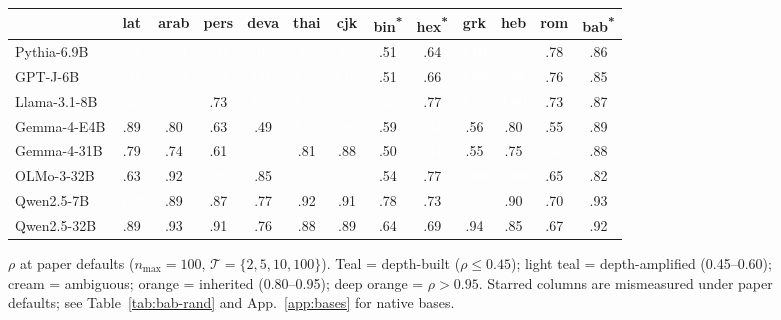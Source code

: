 \documentclass[10pt,letterpaper]{article}
\begin{document}
\newcommand{\rhoA}[1]{\cellcolor{rhoteal!70}\textcolor{white}{#1}}   %
\newcommand{\rhoB}[1]{\cellcolor{rholight!60}#1}                      %
\newcommand{\rhoC}[1]{\cellcolor{rhopaper}#1}                          %
\newcommand{\rhoD}[1]{\cellcolor{rhowarm!50}#1}                        %
\newcommand{\rhoE}[1]{\cellcolor{rhohot!70}\textcolor{white}{#1}}      %

\begin{figure}[t]
\centering
\footnotesize
\setlength{\tabcolsep}{2pt}
\renewcommand{\arraystretch}{0.95}
\begin{tabular}{l|cccccc|cc|ccc|c}
\toprule
 & lat & arab & pers & deva & thai & cjk & bin\textsuperscript{*} & hex\textsuperscript{*} & grk & heb & rom & bab\textsuperscript{*} \\
\midrule
Pythia-6.9B   & \rhoA{.34} & \rhoE{1.00} & \rhoE{.99} & \rhoE{.99} & \rhoE{.98} & \rhoE{.95} & \rhoB{.51} & \rhoC{.64} & \rhoE{1.00} & \rhoE{.95} & \rhoC{.78} & \rhoD{.86} \\
GPT-J-6B      & \rhoA{.41} & \rhoE{1.00} & \rhoE{.99} & \rhoE{1.00} & \rhoE{1.00} & \rhoE{1.00} & \rhoB{.51} & \rhoC{.66} & \rhoE{1.00} & \rhoE{.96} & \rhoC{.76} & \rhoD{.85} \\
Llama-3.1-8B  & \rhoA{.39} & \rhoE{1.00} & \rhoC{.73} & \rhoE{1.00} & \rhoE{1.00} & \rhoE{.99} & \rhoA{.44} & \rhoC{.77} & \rhoE{1.00} & \rhoE{1.00} & \rhoC{.73} & \rhoD{.87} \\
Gemma-4-E4B   & \rhoD{.89} & \rhoC{.80} & \rhoC{.63} & \rhoB{.49} & \rhoE{1.00} & \rhoE{.96} & \rhoB{.59} & \rhoA{.43} & \rhoB{.56} & \rhoC{.80} & \rhoB{.55} & \rhoD{.89} \\
Gemma-4-31B   & \rhoC{.79} & \rhoC{.74} & \rhoC{.61} & \rhoA{.44} & \rhoC{.81} & \rhoD{.88} & \rhoB{.50} & \rhoA{.34} & \rhoB{.55} & \rhoC{.75} & \rhoA{.48} & \rhoD{.88} \\
OLMo-3-32B    & \rhoC{.63} & \rhoD{.92} & \rhoE{.98} & \rhoD{.85} & \rhoE{1.00} & \rhoE{1.00} & \rhoB{.54} & \rhoC{.77} & \rhoE{1.00} & \rhoE{1.00} & \rhoC{.65} & \rhoD{.82} \\
Qwen2.5-7B    & \rhoE{1.00} & \rhoD{.89} & \rhoD{.87} & \rhoC{.77} & \rhoD{.92} & \rhoD{.91} & \rhoC{.78} & \rhoC{.73} & \rhoE{.97} & \rhoD{.90} & \rhoC{.70} & \rhoD{.93} \\
Qwen2.5-32B   & \rhoD{.89} & \rhoD{.93} & \rhoD{.91} & \rhoC{.76} & \rhoD{.88} & \rhoD{.89} & \rhoC{.64} & \rhoC{.69} & \rhoD{.94} & \rhoD{.85} & \rhoC{.67} & \rhoD{.92} \\
\bottomrule
\end{tabular}
\caption{$\rho$ at paper defaults ($n_{\max}=100$,
  $\mathcal{T}=\{2,5,10,100\}$). Teal = depth-built ($\rho \le 0.45$);
  light teal = depth-amplified (0.45--0.60); cream = ambiguous;
  orange = inherited (0.80--0.95); deep orange = $\rho > 0.95$.
  Starred columns are mismeasured under paper defaults; see
  Table~\ref{tab:bab-rand} and App.~\ref{app:bases} for native bases.}
\label{fig:rho-heatmap}
\end{figure}
\end{document}
